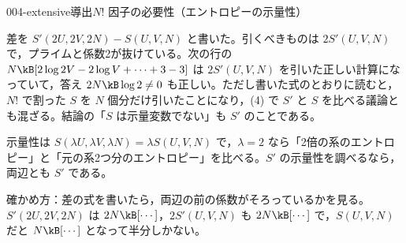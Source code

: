 \documentclass[uplatex,dvipdfmx,a4paper,11pt]{jsarticle}
\begin{document}
\begin{mondai}{004-extensive}{導出}{$N!$ 因子の必要性（エントロピーの示量性）}
\begin{kotaeran}
   差を $S'(2U,2V,2N)-S(U,V,N)$ と書いた。引くべきものは $2S'(U,V,N)$ で，プライムと係数2が抜けている。次の行の $N\kB[2\log2V-2\log V+\cdots+3-3]$ は $2S'(U,V,N)$ を引いた正しい計算になっていて，答え $2N\kB\log2\neq0$ も正しい。ただし書いた式のとおりに読むと，$N!$ で割った $S$ を $N$ 個分だけ引いたことになり，(4) で $S'$ と $S$ を比べる議論とも混ざる。結論の「$S$ は示量変数でない」も $S'$ のことである。
\end{kotaeran}
\begin{rikai}
  \item 示量性は $S(\lambda U,\lambda V,\lambda N)=\lambda S(U,V,N)$ で，$\lambda=2$ なら「2倍の系のエントロピー」と「元の系2つ分のエントロピー」を比べる。$S'$ の示量性を調べるなら，両辺とも $S'$ である。
  \item 確かめ方：差の式を書いたら，両辺の前の係数がそろっているかを見る。$S'(2U,2V,2N)$ は $2N\kB[\cdots]$，$2S'(U,V,N)$ も $2N\kB[\cdots]$ で，$S(U,V,N)$ だと $N\kB[\cdots]$ となって半分しかない。
\end{rikai}
\end{mondai}
\end{document}
